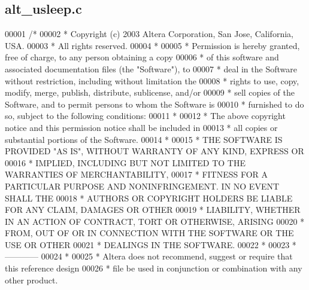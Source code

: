 \subsection{alt\+\_\+usleep.\+c}
\label{alt__usleep_8c_source}

\begin{DoxyCode}
00001 \textcolor{comment}{/*}
00002 \textcolor{comment}{ * Copyright (c) 2003 Altera Corporation, San Jose, California, USA.  }
00003 \textcolor{comment}{ * All rights reserved.}
00004 \textcolor{comment}{ * }
00005 \textcolor{comment}{ * Permission is hereby granted, free of charge, to any person obtaining a copy}
00006 \textcolor{comment}{ * of this software and associated documentation files (the "Software"), to }
00007 \textcolor{comment}{ * deal in the Software without restriction, including without limitation the }
00008 \textcolor{comment}{ * rights to use, copy, modify, merge, publish, distribute, sublicense, and/or}
00009 \textcolor{comment}{ * sell copies of the Software, and to permit persons to whom the Software is }
00010 \textcolor{comment}{ * furnished to do so, subject to the following conditions:}
00011 \textcolor{comment}{ *}
00012 \textcolor{comment}{ * The above copyright notice and this permission notice shall be included in }
00013 \textcolor{comment}{ * all copies or substantial portions of the Software.}
00014 \textcolor{comment}{ * }
00015 \textcolor{comment}{ * THE SOFTWARE IS PROVIDED "AS IS", WITHOUT WARRANTY OF ANY KIND, EXPRESS OR }
00016 \textcolor{comment}{ * IMPLIED, INCLUDING BUT NOT LIMITED TO THE WARRANTIES OF MERCHANTABILITY, }
00017 \textcolor{comment}{ * FITNESS FOR A PARTICULAR PURPOSE AND NONINFRINGEMENT. IN NO EVENT SHALL THE}
00018 \textcolor{comment}{ * AUTHORS OR COPYRIGHT HOLDERS BE LIABLE FOR ANY CLAIM, DAMAGES OR OTHER }
00019 \textcolor{comment}{ * LIABILITY, WHETHER IN AN ACTION OF CONTRACT, TORT OR OTHERWISE, ARISING }
00020 \textcolor{comment}{ * FROM, OUT OF OR IN CONNECTION WITH THE SOFTWARE OR THE USE OR OTHER }
00021 \textcolor{comment}{ * DEALINGS IN THE SOFTWARE.}
00022 \textcolor{comment}{ * }
00023 \textcolor{comment}{ * ------------}
00024 \textcolor{comment}{ *}
00025 \textcolor{comment}{ * Altera does not recommend, suggest or require that this reference design }
00026 \textcolor{comment}{ * file be used in conjunction or combination with any other product.}

\end{DoxyCode}
